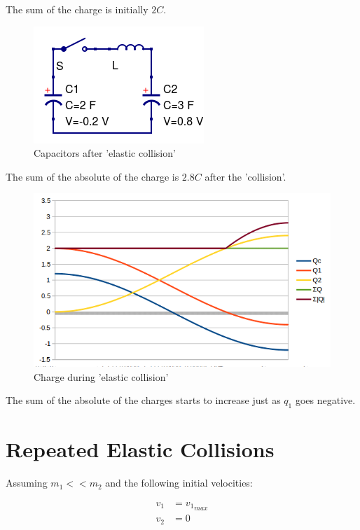 \documentclass[]{../common/elementary-physics}
\begin{document}
The sum of the charge is initially $2 C$.

\begin{figure}[ht] \centering
	\includegraphics[scale=.5]{ccl8} \caption{Capacitors after 'elastic collision'}
\end{figure}

The sum of the absolute of the charge is $2.8 C$ after the 'collision'.

\begin{figure}[ht] \centering
	\includegraphics[scale=.5]{cclg} \caption{Charge during 'elastic collision'}
\end{figure}

The sum of the absolute of the charges starts to increase just as $q_1$ goes negative.

\section{Repeated Elastic Collisions}

Assuming $m_1<<m_2$ and the following initial velocities:

\begin{subequations}
\begin{align}
v_1 &= {v_1}_{max} \\
v_2 &= 0
\end{align}
\end{subequations}
\end{document}
